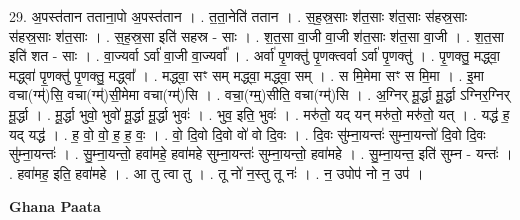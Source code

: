 \documentclass[17pt]{extarticle}
\begin{document}
29. अ॒पस्त॑तान तताना॒पो अ॒पस्त॑तान । . त॒ता॒नेति॑ ततान । . स॒ह॒स्र॒साः श॑त॒साः श॑त॒साः स॑हस्र॒साः स॑हस्र॒साः श॑त॒साः । . स॒ह॒स्र॒सा इति॑ सहस्र - साः । . श॒त॒सा वा॒जी वा॒जी श॑त॒साः श॑त॒सा वा॒जी । . श॒त॒सा इति॑ शत - साः । . वा॒ज्यर्वा ऽर्वा॑ वा॒जी वा॒ज्यर्वा᳚ । . अर्वा॑ पृ॒णक्तु॑ पृ॒णक्त्वर्वा ऽर्वा॑ पृ॒णक्तु॑ । . पृ॒णक्तु॒ मद्ध्वा॒ मद्ध्वा॑ पृ॒णक्तु॑ पृ॒णक्तु॒ मद्ध्वा᳚ । . मद्ध्वा॒ सꣳ सम् मद्ध्वा॒ मद्ध्वा॒ सम् । . स मि॒मेमा सꣳ स मि॒मा । . इ॒मा वचा(ग्म्॑)सि॒ वचा(ग्म्॑)सी॒मेमा वचा(ग्म्॑)सि । . वचा॒(ग्म्॒)सीति॒ वचा(ग्म्॑)सि । . अ॒ग्निर् मू॒र्द्धा मू॒र्द्धा ऽग्निर॒ग्निर् मू॒र्द्धा । . मू॒र्द्धा भुवो॒ भुवो॑ मू॒र्द्धा मू॒र्द्धा भुवः॑ । . भुव॒ इति॒ भुवः॑ । . मरु॑तो॒ यद् यन् मरु॑तो॒ मरु॑तो॒ यत् । . यद्ध॑ ह॒ यद् यद्ध॑ । . ह॒ वो॒ वो॒ ह॒ ह॒ वः॒ । . वो॒ दि॒वो दि॒वो वो॑ वो दि॒वः । . दि॒वः सु॑म्ना॒यन्तः॑ सुम्ना॒यन्तो॑ दि॒वो दि॒वः सु॑म्ना॒यन्तः॑ । . सु॒म्ना॒यन्तो॒ हवा॑महे॒ हवा॑महे सुम्ना॒यन्तः॑ सुम्ना॒यन्तो॒ हवा॑महे । . सु॒म्ना॒यन्त॒ इति॑ सुम्न - यन्तः॑ । . हवा॑मह॒ इति॒ हवा॑महे । . आ तु त्वा तु । . तू नो॑ न॒स्तु तू नः॑ । . न॒ उपोप॑ नो न॒ उप॑ । \newline

\textbf{Ghana Paata } \newline
\end{document}
